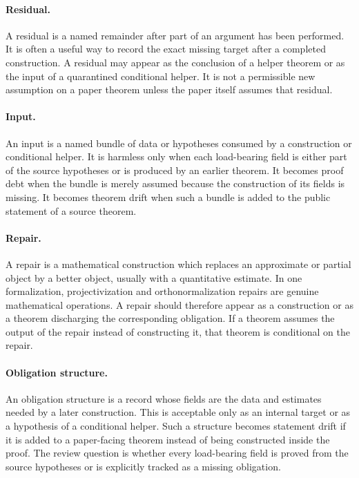 \documentclass[11pt]{article}
\begin{document}
\paragraph{Residual.}
A residual is a named remainder after part of an argument has been performed.
It is often a useful way to record the exact missing target after a completed
construction.  A residual may appear as the conclusion of a helper theorem or
as the input of a quarantined conditional helper.  It is not a permissible new
assumption on a paper theorem unless the paper itself assumes that residual.

\paragraph{Input.}
An input is a named bundle of data or hypotheses consumed by a construction or
conditional helper.  It is harmless only when each load-bearing field is either
part of the source hypotheses or is produced by an earlier theorem.  It becomes
proof debt when the bundle is merely assumed because the construction of its
fields is missing.  It becomes theorem drift when such a bundle is added to the
public statement of a source theorem.

\paragraph{Repair.}
A repair is a mathematical construction which replaces an approximate or
partial object by a better object, usually with a quantitative estimate.  In
one formalization, projectivization and
orthonormalization repairs are genuine mathematical operations.  A repair
should therefore appear as a construction or as a theorem discharging the
corresponding obligation.  If a theorem assumes the output of the repair instead
of constructing it, that theorem is conditional on the repair.

\paragraph{Obligation structure.}
An obligation structure is a record whose fields are the data and estimates
needed by a later construction.  This is acceptable only as an internal target
or as a hypothesis of a conditional helper.  Such a structure becomes statement
drift if it is added to a paper-facing theorem instead of being constructed
inside the proof.  The review question is whether every load-bearing field is
proved from the source hypotheses or is explicitly tracked as a missing
obligation.
\end{document}
